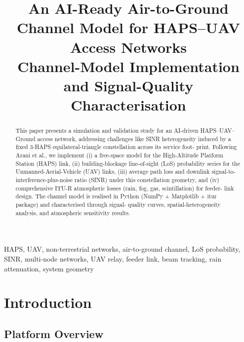 \documentclass[conference]{IEEEtran}
\begin{document}
\title{An AI-Ready Air-to-Ground Channel Model for HAPS--UAV Access Networks\\
\large Channel-Model Implementation and Signal-Quality Characterisation}

\author{
}

\maketitle

\begin{abstract}

This paper presents a simulation and validation
study for an AI-driven HAPS–UAV–Ground access network,
addressing challenges like SINR heterogeneity induced by a fixed
3-HAPS equilateral-triangle constellation across its service foot-
print. Following Arani et al., we implement (i) a free-space model
for the High-Altitude Platform Station (HAPS) link, (ii)
building-blockage line-of-sight (LoS) probability series for the
Unmanned-Aerial-Vehicle (UAV) links, (iii) average
path loss and downlink signal-to-interference-plus-noise ratio
(SINR) under this constellation geometry, and (iv) comprehensive
ITU-R atmospheric losses (rain, fog, gas, scintillation) for feeder-
link design. The channel model is realised in Python (NumPy +
Matplotlib + itur package) and characterised through signal-
quality curves, spatial-heterogeneity analysis, and atmospheric
sensitivity results.
\end{abstract}

\begin{IEEEkeywords}
HAPS, UAV, non-terrestrial networks, air-to-ground channel, LoS probability, SINR, multi-node networks, UAV relay, feeder link, beam tracking, rain attenuation, system geometry
\end{IEEEkeywords}

\section{Introduction}

\subsection{Platform Overview}
\end{document}
